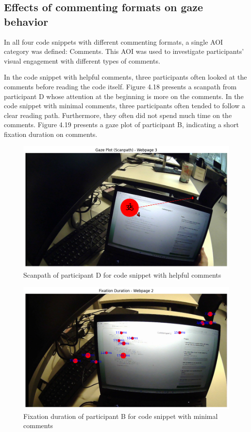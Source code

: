 \subsection{Effects of commenting formats on gaze behavior}

In all four code snippets with different commenting formats, a single AOI category was defined: Comments. This AOI was used to investigate participants’ visual engagement with different types of comments. 

In the code snippet with helpful comments, three participants often looked at the comments before reading the code itself.  Figure 4.18 presents a scanpath from participant D whose attention at the beginning is more on the comments. In the code snippet with minimal comments, three participants often tended to follow a clear reading path.  Furthermore, they often did not spend much time on the comments. Figure 4.19  presents a gaze plot of participant B, indicating a short fixation duration on comments. 

\begin{figure} [H]
  \centering
  \includegraphics[scale=0.6]{figures/h-com.png}
  \caption{Scanpath of participant D for code snippet with helpful comments }
  \label{fig:AnhangsChor}
\end{figure}

\begin{figure} [H]
  \centering
  \includegraphics[scale=0.6]{figures/min-com.png}
  \caption{Fixation duration of participant B for code snippet with minimal comments}
  \label{fig:AnhangsChor}
\end{figure}


